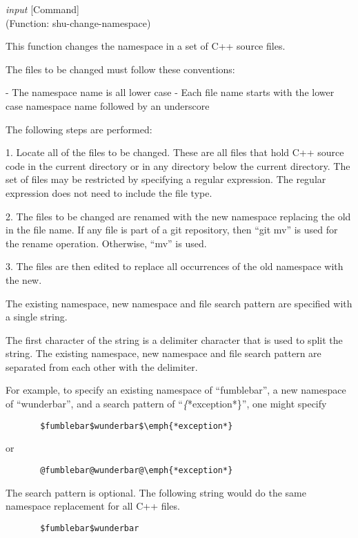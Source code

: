 \vspace{1em}
\noindent
{}
\usebox{\funcname}\emph{input}
 \hfill [Command]\\%
 (Function: shu-change-namespace)

\begin{doc-string}
This function changes the namespace in a set of C++ source files.

The files to be changed must follow these conventions:

 - The namespace name is all lower case
 - Each file name starts with the lower case namespace name followed by an
   underscore

The following steps are performed:

 1. Locate all of the files to be changed.  These are all files that hold C++
 source code in the current directory or in any directory below the current
 directory.  The set of files may be restricted by specifying a regular
 expression.  The regular expression does not need to include the file type.

 2. The files to be changed are renamed with the new namespace replacing the
 old in the file name.  If any file is part of a git repository, then ``git mv''
 is used for the rename operation.  Otherwise, ``mv'' is used.

 3. The files are then edited to replace all occurrences of the old namespace
 with the new.

The existing namespace, new namespace and file search pattern are specified with
a single string.

The first character of the string is a delimiter character that is used to split
the string.  The existing namespace, new namespace and file search pattern are
separated from each other with the delimiter.

For example, to specify an existing namespace of ``fumblebar'', a new namespace
of ``wunderbar'', and a search pattern of ``\emph\{*exception*\}'', one might specify

\small{\begin{verbatim}
       $fumblebar$wunderbar$\emph{*exception*}
\end{verbatim}}

or

\small{\begin{verbatim}
       @fumblebar@wunderbar@\emph{*exception*}
\end{verbatim}}

The search pattern is optional.  The following string would do the same
namespace replacement for all C++ files.

\small{\begin{verbatim}
       $fumblebar$wunderbar
\end{verbatim}}
\end{doc-string}

